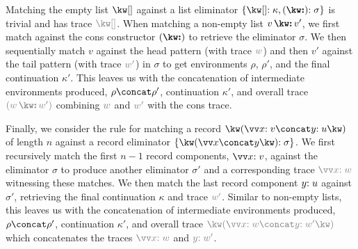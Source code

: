 Matching the empty list $\exNil$ against a list eliminator $\elimList{\kappa}{\sigma}$ is trivial and has trace $\textcolor{gray}{\exNil}$. When matching a non-empty list $\exCons{v}{v'}$, we first match against the cons constructor $(\symCons)$ to retrieve the eliminator $\sigma$. We then sequentially match $v$ against the head pattern (with trace $\textcolor{gray}{w}$) and then $v'$ against the tail pattern (with trace $\textcolor{gray}{w'}$) in $\sigma$ to get environments $\rho$, $\rho'$, and the final continuation $\kappa'$. This leaves us with the concatenation of intermediate environments produced, $\rho \concat \rho'$, continuation $\kappa'$, and overall trace $\textcolor{gray}{(\exCons{w}{w'})}$ combining $\textcolor{gray}{w}$ and $\textcolor{gray}{w'}$ with the cons trace. 

Finally, we consider the rule for matching a record $\exRec{\vec{\bind{x}{v}} \concat \bind{y}{u}}$ of length $n$ against a record eliminator $\elimRec{\vec{x} \concat y}{\sigma}$. We first recursively match the first $n - 1$ record components, $\vec{\bind{x}{v}}$, against the eliminator $\sigma$ to produce another eliminator $\sigma'$ and a corresponding trace $\textcolor{gray}{\vec{\bind{x}{w}}}$ witnessing these matches. We then match the last record component $y{:}\;u$ against $\sigma'$, retrieving the final continuation $\kappa$ and trace $\textcolor{gray}{w'}$. Similar to non-empty lists, this leaves us with the concatenation of intermediate environments produced, $\rho \concat \rho'$, continuation $\kappa'$, and overall trace $\textcolor{gray}{\exRec{\vec{\bind{x}{w}} \concat \bind{y}{w'}}}$ which concatenates the traces $\textcolor{gray}{\vec{\bind{x}{w}}}$ and $\textcolor{gray}{\bind{y}{w'}}$. 


